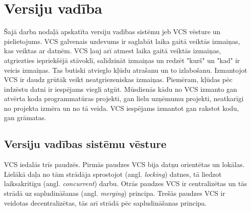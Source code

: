 \chapter{Versiju vadība}


Šajā darba nodaļā apskatīta versiju vadības sistēmu jeb VCS vēsture un pielietojums. VCS galvenais uzdevums ir saglabāt laika gaitā veiktās izmaiņas, kas veiktas ar datnēm. VCS ļauj arī atmest laika gaitā veiktās izmaiņas, atgriezties iepriekšējā stāvoklī, salīdzināt izmaiņas un redzēt "kurš" un "kad" ir veicis izmaiņas. Tas butiski atvieglo kļūdu atrašanu un to izlabošanu. Izmantojot VCS ir daudz grūtāk veikt neatgriezeniskas izmaiņas. Piemēram, kļūdas pēc izdzēstu datni ir iespējams viegli atgūt. Mūsdienās kādu no VCS izmanto gan atvērta koda programmatūras projekti, gan lielu uzņēmumu projekti, neatkarīgi no projekta izmēra un no tā veida. VCS iespējams izmantot gan rakstot kodu, gan grāmatas. \cite[About Version Control]{chacon2014progit}

\section{Versiju vadības sistēmu vēsture}
VCS iedalās trīs paudzēs. Pirmās paudzes VCS bija datņu orientētas un lokālas. Lielākā daļa no tām strādāja sprostojot (angl. \textit{locking}) datnes, tā liedzot laiksakritīgu (angl. \textit{concurrent}) darbu.
Otrās paudzes VCS ir centralizētas un tās strādā uz sapludināšanas (angl. \textit{merging}) principa.
Trešās paudzes VCS ir veidotas decentralizētas, tās arī strādā pēc sapludināšanas principa.
\cite[history]{raymondVCS}
